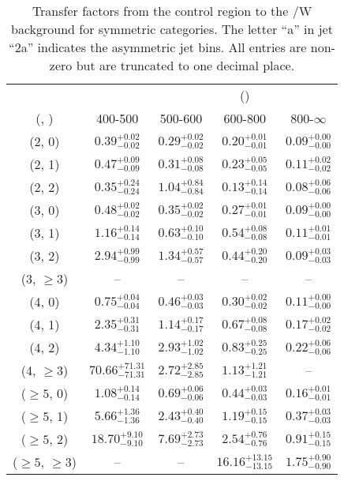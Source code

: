 \begin{table}[h!]
\tiny
\centering
\caption{Transfer factors from the \gj control region to the \ttbar/W background for symmetric categories. The letter ``a'' in jet \eg ``2a''  indicates the asymmetric jet bins. All entries are non-zero but are truncated to one decimal place.\label{tab:tf_gj_ttw_sym}}
\begin{tabular}
{ccccc}
	\hline\hline
&	& \multicolumn{4}{c}{\scalht (\gev)} \\ 
	 (\njet,  \nb) & 400-500 & 500-600 & 600-800 & 800-$\infty$ \\ [0.8ex] 
\hline
	(2, 0) & $0.39^{+ 0.02 }_{- 0.02 }$ & $0.29^{+ 0.02 }_{- 0.02 }$ & $0.20^{+ 0.01 }_{- 0.01 }$ & $0.09^{+ 0.00 }_{- 0.00 }$ \\[0.5ex] 
	(2, 1) & $0.47^{+ 0.09 }_{- 0.09 }$ & $0.31^{+ 0.08 }_{- 0.08 }$ & $0.23^{+ 0.05 }_{- 0.05 }$ & $0.11^{+ 0.02 }_{- 0.02 }$ \\[0.5ex] 
	(2, 2) & $0.35^{+ 0.24 }_{- 0.24 }$ & $1.04^{+ 0.84 }_{- 0.84 }$ & $0.13^{+ 0.14 }_{- 0.14 }$ & $0.08^{+ 0.06 }_{- 0.06 }$ \\[0.5ex] 
	(3, 0) & $0.48^{+ 0.02 }_{- 0.02 }$ & $0.35^{+ 0.02 }_{- 0.02 }$ & $0.27^{+ 0.01 }_{- 0.01 }$ & $0.09^{+ 0.00 }_{- 0.00 }$ \\[0.5ex] 
	(3, 1) & $1.16^{+ 0.14 }_{- 0.14 }$ & $0.63^{+ 0.10 }_{- 0.10 }$ & $0.54^{+ 0.08 }_{- 0.08 }$ & $0.11^{+ 0.01 }_{- 0.01 }$ \\[0.5ex] 
	(3, 2) & $2.94^{+ 0.99 }_{- 0.99 }$ & $1.34^{+ 0.57 }_{- 0.57 }$ & $0.44^{+ 0.20 }_{- 0.20 }$ & $0.09^{+ 0.03 }_{- 0.03 }$ \\[0.5ex] 
	(3, $\ge3$) & -- & -- & -- & -- \\[0.5ex] 
	(4, 0) & $0.75^{+ 0.04 }_{- 0.04 }$ & $0.46^{+ 0.03 }_{- 0.03 }$ & $0.30^{+ 0.02 }_{- 0.02 }$ & $0.11^{+ 0.00 }_{- 0.00 }$ \\[0.5ex] 
	(4, 1) & $2.35^{+ 0.31 }_{- 0.31 }$ & $1.14^{+ 0.17 }_{- 0.17 }$ & $0.67^{+ 0.08 }_{- 0.08 }$ & $0.17^{+ 0.02 }_{- 0.02 }$ \\[0.5ex] 
	(4, 2) & $4.34^{+ 1.10 }_{- 1.10 }$ & $2.93^{+ 1.02 }_{- 1.02 }$ & $0.83^{+ 0.25 }_{- 0.25 }$ & $0.22^{+ 0.06 }_{- 0.06 }$ \\[0.5ex] 
	(4, $\ge3$) & $70.66^{+ 71.31 }_{- 71.31 }$ & $2.72^{+ 2.85 }_{- 2.85 }$ & $1.13^{+ 1.21 }_{- 1.21 }$ & -- \\[0.5ex] 
	($\ge5$, 0) & $1.08^{+ 0.14 }_{- 0.14 }$ & $0.69^{+ 0.06 }_{- 0.06 }$ & $0.44^{+ 0.03 }_{- 0.03 }$ & $0.16^{+ 0.01 }_{- 0.01 }$ \\[0.5ex] 
	($\ge5$, 1) & $5.66^{+ 1.36 }_{- 1.36 }$ & $2.43^{+ 0.40 }_{- 0.40 }$ & $1.19^{+ 0.15 }_{- 0.15 }$ & $0.37^{+ 0.03 }_{- 0.03 }$ \\[0.5ex] 
	($\ge5$, 2) & $18.70^{+ 9.10 }_{- 9.10 }$ & $7.69^{+ 2.73 }_{- 2.73 }$ & $2.54^{+ 0.76 }_{- 0.76 }$ & $0.91^{+ 0.15 }_{- 0.15 }$ \\[0.5ex] 
	($\ge5$, $\ge3$) & -- & -- & $16.16^{+ 13.15 }_{- 13.15 }$ & $1.75^{+ 0.90 }_{- 0.90 }$ \\[0.5ex] 
	\hline
	\hline
\end{tabular}
\end{table}
